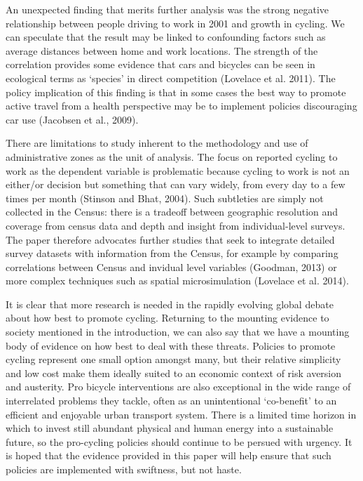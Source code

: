 An unexpected finding that merits further analysis was the strong
negative relationship between people driving to work in 2001 and growth
in cycling. We can speculate that the result may be linked to
confounding factors such as average distances between home and work
locations. The strength of the correlation provides some evidence that
cars and bicycles can be seen in ecological terms as `species' in direct
competition (Lovelace et al. 2011). The policy implication of this
finding is that in some cases the best way to promote active travel from
a health perspective may be to implement policies discouraging car use
(Jacobsen et al., 2009).

There are limitations to study inherent to the methodology and use of
administrative zones as the unit of analysis. The focus on reported
cycling to work as the dependent variable is problematic because cycling
to work is not an either/or decision but something that can vary widely,
from every day to a few times per month (Stinson and Bhat, 2004). Such
subtleties are simply not collected in the Census: there is a tradeoff
between geographic resolution and coverage from census data and depth
and insight from individual-level surveys. The paper therefore advocates
further studies that seek to integrate detailed survey datasets with
information from the Census, for example by comparing correlations
between Census and invidual level variables (Goodman, 2013) or more
complex techniques such as spatial microsimulation (Lovelace et al.
2014).

It is clear that more research is needed in the rapidly evolving global
debate about how best to promote cycling. Returning to the mounting
evidence to society mentioned in the introduction, we can also say that
we have a mounting body of evidence on how best to deal with these
threats. Policies to promote cycling represent one small option amongst
many, but their relative simplicity and low cost make them ideally
suited to an economic context of risk aversion and austerity. Pro
bicycle interventions are also exceptional in the wide range of
interrelated problems they tackle, often as an unintentional
`co-benefit' to an efficient and enjoyable urban transport system. There
is a limited time horizon in which to invest still abundant physical and
human energy into a sustainable future, so the pro-cycling policies
should continue to be persued with urgency. It is hoped that the
evidence provided in this paper will help ensure that such policies are
implemented with swiftness, but not haste.

